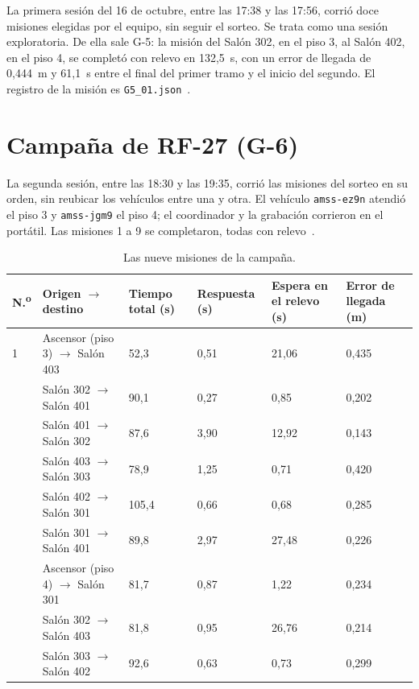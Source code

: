 \documentclass[12pt,letterpaper]{article}
\begin{document}
La primera sesión del 16 de octubre, entre las 17:38 y las 17:56, corrió doce misiones elegidas por el equipo, sin seguir el sorteo. Se trata como una sesión exploratoria. De ella sale G-5: la misión del Salón 302, en el piso 3, al Salón 402, en el piso 4, se completó con relevo en 132,5~s, con un error de llegada de 0,444~m y 61,1~s entre el final del primer tramo y el inicio del segundo. El registro de la misión es \texttt{G5\_01.json}~\cite{campana}.

\section{Campaña de RF-27 (G-6)}

La segunda sesión, entre las 18:30 y las 19:35, corrió las misiones del sorteo en su orden, sin reubicar los vehículos entre una y otra. El vehículo \texttt{amss-ez9n} atendió el piso 3 y \texttt{amss-jgm9} el piso 4; el coordinador y la grabación corrieron en el portátil. Las misiones 1 a 9 se completaron, todas con relevo~\cite{campana,metricas}.

\begin{table}[H]
    \centering
    \small
    \caption{Las nueve misiones de la campaña.}
    \label{tab:misiones}
    \begin{tabular}{@{}p{0.9cm}p{4.3cm}p{2.0cm}p{2.1cm}p{2.3cm}p{2.3cm}@{}}
        \toprule
        \textbf{N.\textsuperscript{o}} & \textbf{Origen $\rightarrow$ destino} & \textbf{Tiempo total (s)} & \textbf{Respuesta (s)} & \textbf{Espera en el relevo (s)} & \textbf{Error de llegada (m)} \\ \midrule
        1 & Ascensor (piso 3) $\rightarrow$ Salón 403 & 52,3 & 0,51 & 21,06 & 0,435 \\ \addlinespace
        2 & Salón 302 $\rightarrow$ Salón 401 & 90,1 & 0,27 & 0,85 & 0,202 \\ \addlinespace
        3 & Salón 401 $\rightarrow$ Salón 302 & 87,6 & 3,90 & 12,92 & 0,143 \\ \addlinespace
        4 & Salón 403 $\rightarrow$ Salón 303 & 78,9 & 1,25 & 0,71 & 0,420 \\ \addlinespace
        5 & Salón 402 $\rightarrow$ Salón 301 & 105,4 & 0,66 & 0,68 & 0,285 \\ \addlinespace
        6 & Salón 301 $\rightarrow$ Salón 401 & 89,8 & 2,97 & 27,48 & 0,226 \\ \addlinespace
        7 & Ascensor (piso 4) $\rightarrow$ Salón 301 & 81,7 & 0,87 & 1,22 & 0,234 \\ \addlinespace
        8 & Salón 302 $\rightarrow$ Salón 403 & 81,8 & 0,95 & 26,76 & 0,214 \\ \addlinespace
        9 & Salón 303 $\rightarrow$ Salón 402 & 92,6 & 0,63 & 0,73 & 0,299 \\ \bottomrule
    \end{tabular}
\end{table}
\end{document}
